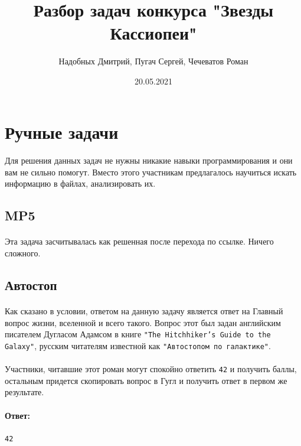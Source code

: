 \documentclass[12pt]{article}
\title{Разбор задач конкурса "Звезды Кассиопеи"}
\date{20.05.2021}
\author{Надобных Дмитрий, Пугач Сергей, Чечеватов Роман}
\begin{document}
    \maketitle
    \newpage
    \raggedright

    \section{Ручные задачи}
    \paragraph{}
    Для решения данных задач не нужны никакие навыки программирования и они вам не сильно помогут.
    Вместо этого участникам предлагалось научиться искать информацию в файлах, анализировать их.
    \newpage

    \subsection{MP5}
    \paragraph{}
    Эта задача засчитывалась как решенная после перехода по ссылке.
    Ничего сложного.

    \subsection{Автостоп}
    \paragraph{}
    Как сказано в условии, ответом на данную задачу является ответ на Главный вопрос жизни, вселенной и всего такого.
    Вопрос этот был задан английским писателем Дугласом Адамсом в книге \verb|"The Hitchhiker’s Guide to the Galaxy"|,
    русским читателям известной как \verb|"Автостопом по галактике"|.
    \paragraph{}
    Участники, читавшие этот роман могут спокойно ответить \verb|42| и получить баллы,
    остальным придется скопировать вопрос в Гугл и получить ответ в первом же результате.
    \paragraph{Ответ:}
    \verb|42|
\end{document}
